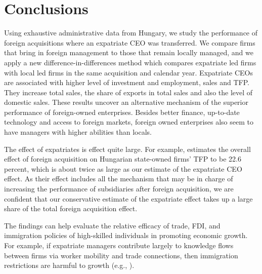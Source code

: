 \documentclass[12pt,a4paper]{article}
\begin{document}
\section{Conclusions}

Using exhaustive administrative data from Hungary, we study the performance of foreign acquisitions where an expatriate CEO was transferred. We compare firms that bring in foreign management to those that remain locally managed, and we apply a new difference-in-differences method which compares expatriate led firms with local led firms in the same acquisition and calendar year. Expatriate CEOs are associated with higher level of investment and employment, sales and TFP. They increase total sales, the share of exports in total sales and also the level of domestic sales. These results uncover an alternative mechanism of the superior performance of foreign-owned enterprises. Besides better finance, up-to-date technology and access to foreign markets, foreign owned enterprises also seem to have managers with higher abilities than locals. 

The effect of expatriates is effect quite large. For example, \cite{Brown2006-rn} estimates the overall effect of foreign acquisition on Hungarian state-owned firms' TFP to be 22.6 percent, which is about twice as large as our estimate of the expatriate CEO effect. As their effect includes all the mechanism that may be in charge of increasing the performance of subsidiaries after foreign acquisition, we are confident that our conservative estimate of the expatriate effect takes up a large share of the total foreign acquisition effect.

The findings can help evaluate the relative efficacy of trade, FDI, and immigration policies of high-skilled individuals in promoting economic growth. For example, if expatriate managers contribute largely to knowledge flows between firms via worker mobility and trade connections, then immigration restrictions are harmful to growth (e.g., \cite{Kerr2010-le}). 


\clearpage

\end{document}
